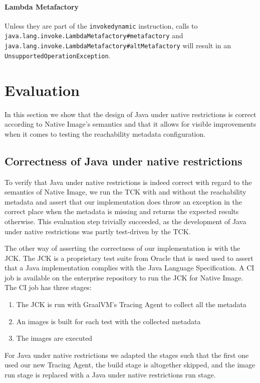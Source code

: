 \subsubsection{Lambda Metafactory}
Unless they are part of the \texttt{invokedynamic} instruction, calls to \texttt{java.lang.invoke.LambdaMetafactory\#metafactory} and \texttt{java.lang.invoke.LambdaMetafactory\#altMetafactory} will result in an \texttt{UnsupportedOperationException}.


\chapter{Evaluation}
In this section we show that the design of Java under native restrictions is correct according to Native Image's semantics and that it allows for visible improvements when it comes to testing the reachability metadata configuration.

\section{Correctness of Java under native restrictions}
To verify that Java under native restrictions is indeed correct with regard to the semantics of Native Image, we run the TCK with and without the reachability metadata and assert that our implementation does throw an exception in the correct place when the metadata is missing and returns the expected results otherwise. This evaluation step trivially succeeded, as the development of Java under native restrictions was partly test-driven by the TCK.

The other way of asserting the correctness of our implementation is with the JCK. The JCK is a proprietary test suite from Oracle that is used used to assert that a Java implementation complies with the Java Language Specification. A CI job is available on the enterprise repository to run the JCK for Native Image. The CI job has three stages:
\begin{enumerate}
    \item The JCK is run with GraalVM's Tracing Agent to collect all the metadata
    \item An images is built for each test with the collected metadata
    \item The images are executed
\end{enumerate}
For Java under native restrictions we adapted the stages such that the first one used our new Tracing Agent, the build stage is altogether skipped, and the image run stage is replaced with a Java under native restrictions run stage.

